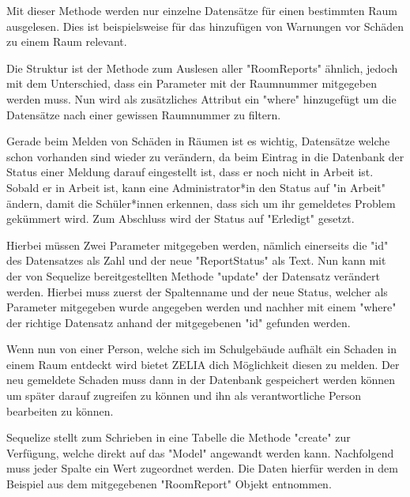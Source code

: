 Mit dieser Methode werden nur einzelne Datensätze für einen bestimmten Raum ausgelesen. Dies ist beispielsweise für das hinzufügen von Warnungen vor Schäden zu einem Raum relevant. 

Die Struktur ist der Methode zum Auslesen aller "RoomReports" ähnlich, jedoch mit dem Unterschied, dass ein Parameter mit der Raumnummer mitgegeben werden muss. Nun wird als zusätzliches Attribut ein "where" hinzugefügt um die Datensätze nach einer gewissen Raumnummer zu filtern.



Gerade beim Melden von Schäden in Räumen ist es wichtig, Datensätze welche schon vorhanden sind wieder zu verändern, da beim Eintrag in die Datenbank der Status einer Meldung darauf eingestellt ist, dass er noch nicht in Arbeit ist. Sobald er in Arbeit ist, kann eine Administrator*in den Status auf "in Arbeit" ändern, damit die Schüler*innen erkennen, dass sich um ihr gemeldetes Problem gekümmert wird. Zum Abschluss wird der Status auf "Erledigt" gesetzt.

Hierbei müssen Zwei Parameter mitgegeben werden, nämlich einerseits die "id" des Datensatzes als Zahl und der neue "ReportStatus" als Text. Nun kann mit der von Sequelize bereitgestellten Methode "update" der Datensatz verändert werden. Hierbei muss zuerst der Spaltenname und der neue Status, welcher als Parameter mitgegeben wurde angegeben werden und nachher mit einem "where" der richtige Datensatz anhand der mitgegebenen "id" gefunden werden.



Wenn nun von einer Person, welche sich im Schulgebäude aufhält ein Schaden in einem Raum entdeckt wird bietet ZELIA dich Möglichkeit diesen zu melden. Der neu gemeldete Schaden muss dann in der Datenbank gespeichert werden können um später darauf zugreifen zu können und ihn als verantwortliche Person bearbeiten zu können.

Sequelize stellt zum Schrieben in eine Tabelle die Methode "create" zur Verfügung, welche direkt auf das "Model" angewandt werden kann. Nachfolgend muss jeder Spalte ein Wert zugeordnet werden. Die Daten hierfür werden in dem Beispiel aus dem mitgegebenen "RoomReport" Objekt entnommen.

